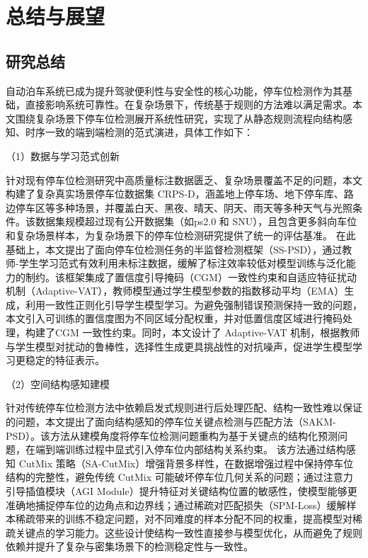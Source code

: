  \setlength{\baselineskip}{20pt}
\chapter{总结与展望}
\label{cha:chap5}



\section{研究总结}

自动泊车系统已成为提升驾驶便利性与安全性的核心功能，停车位检测作为其基础，直接影响系统可靠性。在复杂场景下，传统基于规则的方法难以满足需求。本文围绕复杂场景下停车位检测展开系统性研究，实现了从静态规则流程向结构感知、时序一致的端到端检测的范式演进，具体工作如下：

（1）数据与学习范式创新

针对现有停车位检测研究中高质量标注数据匮乏、复杂场景覆盖不足的问题，本文构建了复杂真实场景停车位数据集 CRPS-D，涵盖地上停车场、地下停车库、路边停车区等多种场景，并覆盖白天、黑夜、晴天、阴天、雨天等多种天气与光照条件。该数据集规模超过现有公开数据集（如ps2.0 和 SNU），且包含更多斜向车位和复杂场景样本，为复杂场景下的停车位检测研究提供了统一的评估基准。
在此基础上，本文提出了面向停车位检测任务的半监督检测框架（SS-PSD），通过教师-学生学习范式有效利用未标注数据，缓解了标注效率较低对模型训练与泛化能力的制约。该框架集成了置信度引导掩码（CGM）一致性约束和自适应特征扰动机制（Adaptive-VAT），教师模型通过学生模型参数的指数移动平均（EMA）生成，利用一致性正则化引导学生模型学习。为避免强制错误预测保持一致的问题，本文引入可训练的置信度图为不同区域分配权重，并对低置信度区域进行掩码处理，构建了CGM 一致性约束。同时，本文设计了 Adaptive-VAT 机制，根据教师与学生模型对扰动的鲁棒性，选择性生成更具挑战性的对抗噪声，促进学生模型学习更稳定的特征表示。

（2）空间结构感知建模

针对传统停车位检测方法中依赖启发式规则进行后处理匹配、结构一致性难以保证的问题，本文提出了面向结构感知的停车位关键点检测与匹配方法（SAKM-PSD）。该方法从建模角度将停车位检测问题重构为基于关键点的结构化预测问题，在端到端训练过程中显式引入停车位内部结构关系约束。
该方法通过结构感知 CutMix 策略（SA-CutMix）增强背景多样性，在数据增强过程中保持停车位结构的完整性，避免传统 CutMix 可能破坏停车位几何关系的问题；通过注意力引导插值模块（AGI Module）提升特征对关键结构位置的敏感性，使模型能够更准确地捕捉停车位的边角点和边界线；通过稀疏对匹配损失（SPM-Loss）缓解样本稀疏带来的训练不稳定问题，对不同难度的样本分配不同的权重，提高模型对稀疏关键点的学习能力。这些设计使结构一致性直接参与模型优化，从而避免了规则依赖并提升了复杂与密集场景下的检测稳定性与一致性。

